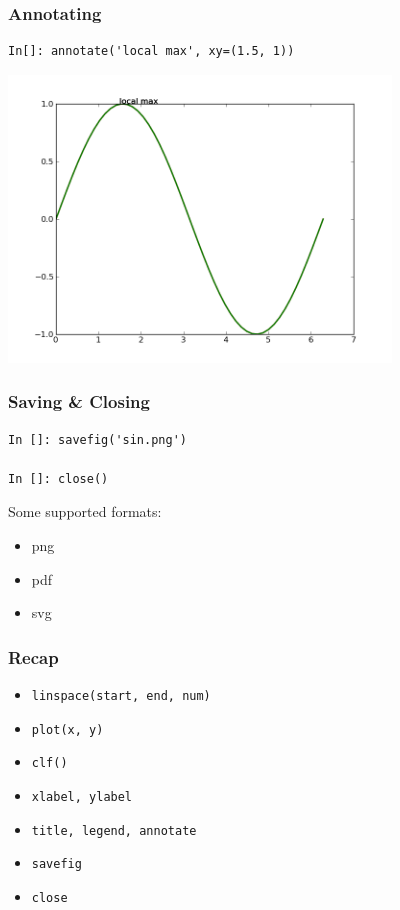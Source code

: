 \documentclass[14pt,compress]{beamer}
\newcommand{\typ}[1]{\lstinline{#1}}
\begin{document}
\begin{frame}[fragile]
\frametitle{Annotating}
\vspace*{-0.1in}
\begin{lstlisting}
In[]: annotate('local max', xy=(1.5, 1))
\end{lstlisting}
\vspace*{-0.2in}
\begin{center}
  \includegraphics[height=3in, interpolate=true]{data/annotate}
\end{center}
\end{frame}

\begin{frame}[fragile]
\frametitle{Saving \& Closing}
\begin{lstlisting}
In []: savefig('sin.png')

In []: close()
\end{lstlisting}
Some supported formats:
\begin{itemize}
\item png
\item pdf
\item svg
\end{itemize}
\end{frame}

\begin{frame}[fragile]
  \frametitle{Recap}
  \begin{itemize}
  \item \typ{linspace(start, end, num)}
  \item \typ{plot(x, y)}
  \item \typ{clf()}
  \item \typ{xlabel, ylabel}
  \item \typ{title, legend, annotate}
  \item \typ{savefig}
  \item \typ{close}
  \end{itemize}
\end{frame}
\end{document}
